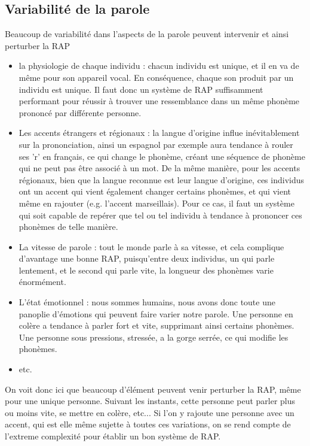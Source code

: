 	\subsection{Variabilité de la parole}
	Beaucoup de variabilité dans l'aspects de la parole peuvent intervenir et ainsi perturber la RAP~\cite{speech-variability}
	\begin{itemize}
		\item la physiologie de chaque individu : chacun individu est unique, et il en va de même pour son appareil vocal. En conséquence, chaque son produit par un individu est unique. Il faut donc un système de RAP suffisamment performant pour réussir à trouver une ressemblance dans un même phonème prononcé par différente personne.
		\item Les accents étrangers et régionaux : la langue d'origine influe inévitablement sur la prononciation, ainsi un espagnol par exemple aura tendance à rouler ses 'r' en français, ce qui change le phonème, créant une séquence de phonème qui ne peut pas être associé à un mot. De la même manière, pour les accents régionaux, bien que la langue reconnue est leur langue d'origine, ces individus ont un accent qui vient également changer certains phonèmes, et qui vient même en rajouter (e.g. l'accent marseillais). Pour ce cas, il faut un système qui soit capable de repérer que tel ou tel individu à tendance à prononcer ces phonèmes de telle manière.
		\item La vitesse de parole : tout le monde parle à sa vitesse, et cela complique d'avantage une bonne RAP, puisqu'entre deux individus, un qui parle lentement, et le second qui parle vite, la longueur des phonèmes varie énormément.
		\item L'état émotionnel : nous sommes humains, nous avons donc toute une panoplie d'émotions qui peuvent faire varier notre parole. Une personne en colère a tendance à parler fort et vite, supprimant ainsi certains phonèmes. Une personne sous pressions, stressée, a la gorge serrée, ce qui modifie les phonèmes.
		\item etc.
	\end{itemize}
	
	On voit donc ici que beaucoup d'élément peuvent venir perturber la RAP, même pour une unique personne. Suivant les instants, cette personne peut parler plus ou moins vite, se mettre en colère, etc... Si l'on y rajoute une personne avec un accent, qui est elle même sujette à toutes ces variations, on se rend compte de l'extreme complexité pour établir un bon système de RAP.
	
